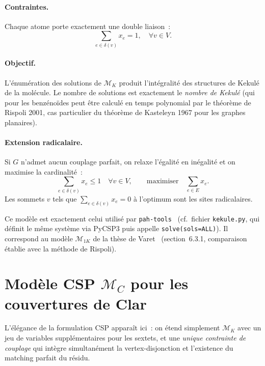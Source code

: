 \documentclass[a4paper,11pt]{article}
\begin{document}
\paragraph{Contraintes.} Chaque atome porte exactement une double liaison~:
\begin{equation}
  \sum_{e \in \delta(v)} x_e = 1, \quad \forall v \in V.
  \tag{C-Kek}
\end{equation}

\paragraph{Objectif.} L'\'enum\'eration des solutions de $\mathcal{M}_K$ produit l'int\'egralit\'e
des structures de Kekul\'e de la mol\'ecule. Le nombre de solutions est exactement le
\emph{nombre de Kekul\'e} (qui pour les benz\'eno\"ides peut \^etre calcul\'e en temps
polynomial par le th\'eor\`eme de Rispoli 2001, cas particulier du th\'eor\`eme de Kasteleyn 1967
pour les graphes planaires).

\paragraph{Extension radicalaire.} Si $G$ n'admet aucun couplage parfait, on relaxe l'\'egalit\'e
en in\'egalit\'e et on maximise la cardinalit\'e~:
\begin{equation}
  \sum_{e \in \delta(v)} x_e \leq 1 \quad \forall v \in V,
  \qquad \text{maximiser} \quad \sum_{e \in E} x_e.
\end{equation}
Les sommets $v$ tels que $\sum_{e \in \delta(v)} x_e = 0$ \`a l'optimum sont les sites
radicalaires.

Ce mod\`ele est exactement celui utilis\'e par \texttt{pah-tools}~\cite{pahtools} (cf.\
fichier \texttt{kekule.py}, qui d\'efinit le m\^eme syst\`eme via PyCSP3 puis appelle
\texttt{solve(sols=ALL)}). Il correspond au mod\`ele $\mathcal{M}_{1K}$ de la th\`ese
de Varet~\cite{varet2023benzai} (section~6.3.1, comparaison \'etablie avec la m\'ethode
de Rispoli).

\section{Mod\`ele CSP $\mathcal{M}_C$ pour les couvertures de Clar}

L'\'el\'egance de la formulation CSP appara\^it ici~: on \'etend simplement $\mathcal{M}_K$ avec
un jeu de variables suppl\'ementaires pour les sextets, et une \emph{unique contrainte de
couplage} qui int\`egre simultan\'ement la vertex-disjonction et l'existence du matching
parfait du r\'esidu.
\end{document}
